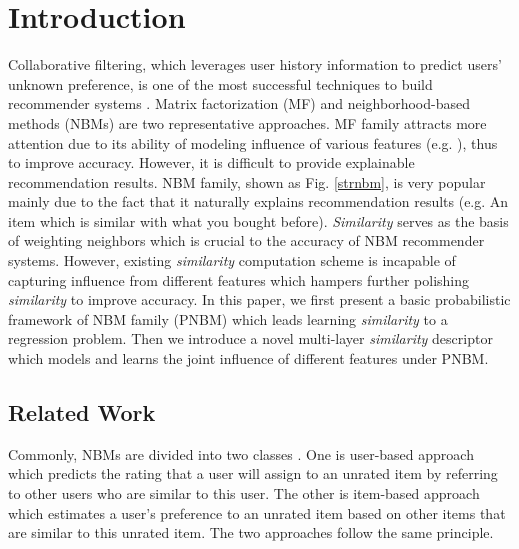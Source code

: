 \documentclass[conference]{IEEEtran}
\begin{document}
\section{Introduction}
\label{introduction}
Collaborative filtering, which leverages user history information to predict users' unknown preference, is one of the most successful techniques to build recommender systems \cite{su2009survey}. Matrix factorization (MF) \cite{koren2009matrix} and neighborhood-based methods (NBMs) \cite{desrosiers2011comprehensive} are two representative approaches. MF family attracts more attention due to its ability of modeling influence of various features (e.g. \cite{zheng2015incorporating, yang2016learning, koren2008factorization}), thus to improve accuracy. However, it is difficult to provide explainable recommendation results. NBM family, shown as Fig. \ref{strnbm}, is very popular mainly due to the fact that it naturally explains recommendation results (e.g. An item which is similar with what you bought before). \emph{Similarity} serves as the basis of weighting neighbors which is crucial to the accuracy of NBM recommender systems. However, existing \emph{similarity} computation scheme is incapable of capturing influence from different features which hampers further polishing \emph{similarity} to improve accuracy. In this paper, we first present a basic probabilistic framework of NBM family (PNBM) which leads learning \emph{similarity} to a regression problem. Then we introduce a novel multi-layer \emph{similarity} descriptor which models and learns the joint influence of different features under PNBM.


\subsection{Related Work}
\label{relwork1}
Commonly, NBMs are divided into two classes \cite{desrosiers2011comprehensive}. One is user-based approach which predicts the rating that a user will assign to an unrated item by referring to other users who are similar to this user. The other is item-based approach which estimates a user's preference to an unrated item based on other items that are similar to this unrated item. The two approaches follow the same principle.
\end{document}
